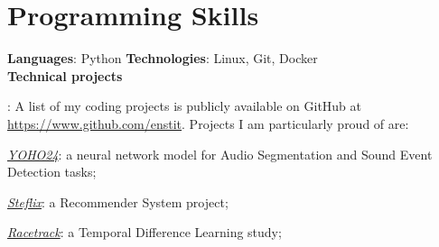 \documentclass[a4paper,english]{article} %
\begin{document}
\section{Programming Skills}
	\textbf{Languages}{: Python}
	\hfill
	\textbf{Technologies}{: Linux, Git, Docker}
	\vspace{0.5em}
	\\
	\textbf{Technical projects}{: A list of my coding projects is publicly available on GitHub at \url{https://www.github.com/enstit}. Projects I am particularly proud of are:
\begin{itemize*}[label=$\Diamond$]
	\item \href{https://www.github.com/enstit/YOHO24}{\textit{YOHO24}}: a neural network model for Audio Segmentation and Sound Event Detection tasks;
	\item \href{https://www.github.com/enstit/Steflix}{\textit{Steflix}}: a Recommender System project;
	\item \href{https://www.github.com/enstit/Racetrack}{\textit{Racetrack}}: a Temporal Difference Learning study;
\end{itemize*}
	}

\end{document}
